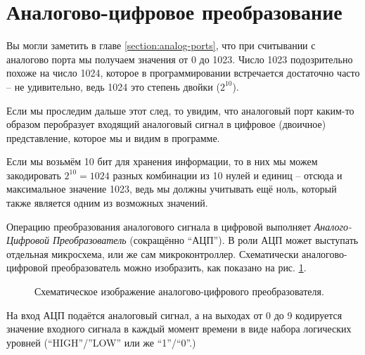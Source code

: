 \documentclass[../sparc.tex]{subfiles}
\begin{document}
\section{Аналогово-цифровое преобразование}

Вы могли заметить в главе \ref{section:analog-ports}, что при считывании с
аналогово порта мы получаем значения от 0 до 1023.  Число 1023 подозрительно
похоже на число 1024, которое в программировании встречается достаточно часто --
не удивительно, ведь 1024 это степень двойки ($2^{10}$).

Если мы проследим дальше этот след, то увидим, что аналоговый порт каким-то
образом перобразует входящий аналоговый сигнал в цифровое (двоичное)
представление, которое мы и видим в программе.

Если мы возьмём 10 бит для хранения информации, то в них мы можем закодировать
$2^{10} = 1024$ разных комбинации из 10 нулей и единиц -- отсюда и максимальное
значение 1023, ведь мы должны учитывать ещё ноль, который также является одним
из возможных значений.

Операцию преобразования аналогового сигнала в цифровой выполняет
\emph{Аналого-Цифровой Преобразователь} (сокращённо ``АЦП'').  В роли АЦП может
выступать отдельная микросхема, или же сам микроконтроллер.  Схематически
аналогово-цифровой преобразователь можно изобразить, как показано на
рис. \ref{fig:adc-schematics}.  

\begin{figure}[ht]
  \centering
  \caption{Схематическое изображение аналогово-цифрового преобразователя.}
  \label{fig:adc-schematics}
\end{figure}

На вход АЦП подаётся аналоговый сигнал, а на выходах от 0 до 9 кодируется
значение входного сигнала в каждый момент времени в виде набора логических
уровней (``HIGH''/''LOW'' или же ``1''/``0''.)
\end{document}
